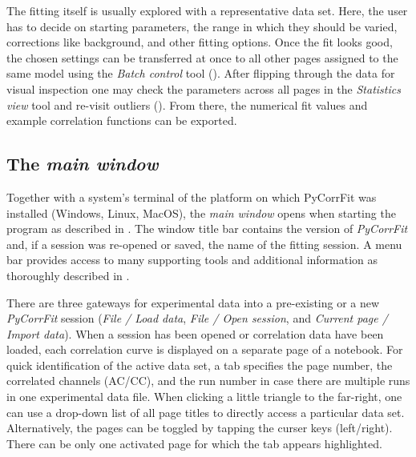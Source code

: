 The fitting itself is usually explored with a representative data set. Here, the user has to decide on starting parameters, the range in which they should be varied, corrections like background, and other fitting options. Once the fit looks good, the chosen settings can be transferred at once to all other pages assigned to the same model using the \textit{Batch control} tool (). After flipping through the data for visual inspection one may check the parameters across all pages in the \textit{Statistics view} tool and re-visit outliers (). From there, the numerical fit values and example correlation functions can be exported.

\subsection{The \textit{main window}}



Together with a system's terminal of the platform on which PyCorrFit was installed (Windows, Linux, MacOS), the \textit{main window} opens when starting the program as described in . The window title bar contains the version of \textit{PyCorrFit} and, if a session was re-opened or saved, the name of the fitting session. A menu bar provides access to many supporting tools and additional information as thoroughly described in . 

There are three gateways for experimental data into a pre-existing or a new \textit{PyCorrFit} session (\textit{File / Load data}, \textit{File / Open session}, and \textit{Current page / Import data}). When a session has been opened or correlation data have been loaded, each correlation curve is displayed on a separate page of a notebook. For quick identification of the active data set, a tab specifies the page number, the correlated channels (AC/CC), and the run number in case there are multiple runs in one experimental data file. When clicking a little triangle to the far-right, one can use a drop-down list of all page titles to directly access a particular data set. Alternatively, the pages can be toggled by tapping the curser keys (left/right). There can be only one activated page for which the tab appears highlighted.


